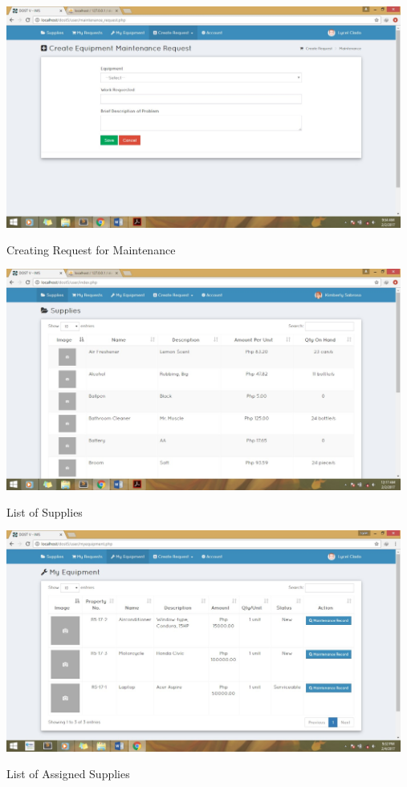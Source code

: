 \begin{center}
\begin{center}
	\includegraphics[width=13cm,height=8cm]{image/d3-3.jpg}\\
	Creating Request for Maintenance\\
	\vspace{1.5cm}
	\includegraphics[width=13cm,height=8cm]{image/d3-4.jpg}\\
	List of Supplies\\
	\vspace{1.5cm}
	\includegraphics[width=13cm,height=8cm]{image/d3-5.jpg}\\
	List of Assigned Supplies\\
\end{center}



\end{center}
